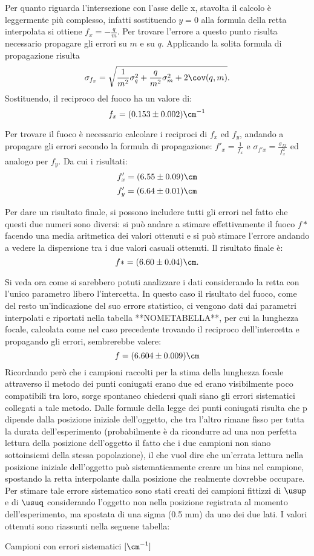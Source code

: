 Per quanto riguarda l'intersezione con l'asse delle x, stavolta il calcolo è leggermente più complesso, infatti sostituendo $y = 0$
 alla formula della retta interpolata si ottiene $f_x = -\frac{q}{m}$.  Per trovare l'errore a questo punto risulta necessario
 propagare gli errori su $m$ e su $q$. Applicando la solita formula di propagazione risulta
\[\sigma_{f_x} = \sqrt {\frac{1} {m^2} \sigma_q^2 + \frac{q}{m^2} \sigma_m^2 + 2 \cov (q,m) }.\] Sostituendo,
 il reciproco del fuoco ha un valore di:
\[f_x = (0.153 \pm 0.002) \cm^{-1}\]

Per trovare il fuoco è necessario calcolare i reciproci di $f_x$ ed $f_y$, andando a propagare gli errori secondo la formula di 
propagazione: $f'_x = \frac{1}{f_x}$ e $\sigma_{f'x} = \frac{\sigma_{fx}}{f_{x}^2}$ ed analogo per $f_y$. Da cui i risultati:
\[f'_x = (6.55 \pm 0.09) \cm \]
\[f'_y = (6.64 \pm 0.01) \cm \]

Per dare un risultato finale, si possono includere tutti gli errori nel fatto che questi due numeri sono diversi: si può andare a
 stimare effettivamente il fuoco $f*$ facendo una media aritmetica dei valori ottenuti e si può stimare l'errore andando a vedere la
 dispersione tra i due valori casuali ottenuti. Il risultato finale è:
\[f* = (6.60 \pm 0.04) \cm .\]

Si veda ora come si sarebbero potuti analizzare i dati considerando la retta con l'unico parametro libero l'intercetta. In questo
 caso il risultato del fuoco, come del resto un'indicazione del suo errore statistico, ci vengono dati dai parametri interpolati e
 riportati nella tabella **NOMETABELLA**, per cui la lunghezza focale, calcolata come nel caso precedente trovando il reciproco
 dell'intercetta e propagando gli errori, sembrerebbe valere:
\[f = (6.604 \pm 0.009) \cm \]
Ricordando però che i campioni raccolti per la stima della lunghezza focale attraverso il metodo dei punti coniugati erano due ed
 erano visibilmente poco compatibili tra loro, sorge spontaneo chiedersi quali siano gli errori sistematici collegati a tale metodo.
 Dalle formule della legge dei punti coniugati risulta che p dipende dalla posizione iniziale dell'oggetto, che tra
 l'altro rimane fisso per tutta la durata dell'esperimento (probabilmente è da ricondurre ad una non perfetta lettura della posizione
 dell'oggetto il fatto che i due campioni non siano sottoinsiemi della stessa popolazione), il che vuol dire che un'errata lettura
 nella posizione iniziale dell'oggetto può sistematicamente creare un bias nel campione, spostando la retta interpolante dalla
 posizione che realmente dovrebbe occupare. Per stimare tale errore sistematico sono stati creati dei campioni fittizzi di $\usup$ e
 di $\usuq$ considerando l'oggetto non nella posizione registrata al momento dell'esperimento, ma spostata di una sigma (0.5 mm) da
 uno dei due lati. I valori ottenuti sono riassunti nella seguene tabella:
\begin{tabella}
	\centering
	
	\caption{Campioni con errori sistematici $[\cm^{-1}]$}
	\label{tab:02tab5}
\end{tabella}

